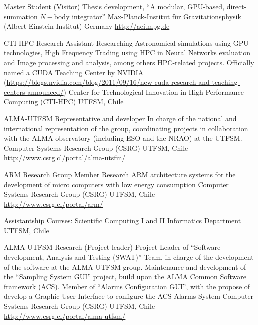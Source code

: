 \documentclass[12pt,a4paper]{moderncv}
\newcommand{\gray}{\textcolor{gray}}
\newcommand{\myurl}[1]{\gray{\url{#1}}}
\newcommand{\aei}{Max-Planck-Institut für Gravitationsphysik (Albert-Einstein-Institut)}
\begin{document}
        {Master Student (Visitor)}
        {Thesis development, %
        ``A modular, GPU-based, direct-summation $N-$body integrator'' }
        {\aei}
        {Germany}
        {\myurl{http://aei.mpg.de}}

        {CTI-HPC Research Assistant}
        {Researching %
         Astronomical simulations using GPU technologies, %
         High Frequency Trading using HPC in Neural Networks evaluation %
         and Image processing and analysis, among others HPC-related projects.
         Officially named a CUDA Teaching Center by NVIDIA
         (\myurl{https://blogs.nvidia.com/blog/2011/09/16/new-cuda-research-and-teaching-centers-announced/})
         }
        {Center for Technological Innovation in High Performance Computing (CTI-HPC)}
        {UTFSM, Chile}
        {}

        {ALMA-UTFSM Representative and developer}
        {In charge of the national and international representation of the group,
         coordinating projects in collaboration with the ALMA observatory
         (including ESO and the NRAO) at the UTFSM.}
        {Computer Systems Research Group (CSRG)}
        {UTFSM, Chile}
        {\myurl{http://www.csrg.cl/portal/alma-utsfm/}}

        {ARM Research Group Member}
        {Research ARM architecture systems for the development of micro computers
         with low energy consumption}
        {Computer Systems Research Group (CSRG)}
        {UTFSM, Chile}
        {\myurl{http://www.csrg.cl/portal/arm/}}

        {Assistantship}
        {Courses: Scientific Computing I and II}
        {Informatics Department}
        {UTFSM, Chile}
        {}

        {ALMA-UTFSM Research (Project leader)}
        {Project Leader of ``Software development, Analysis and Testing (SWAT)''
         Team, in charge of the development of the software at the ALMA-UTFSM group.
         Maintenance and development of the ``Sampling System GUI'' project,
         build upon the ALMA Common Software framework (ACS).
         Member of ``Alarms Configuration GUI'', with the propose of develop a
         Graphic User Interface to configure the ACS Alarms System}
        {Computer Systems Research Group (CSRG)}
        {UTFSM, Chile}
        {\myurl{http://www.csrg.cl/portal/alma-utfsm/}}
\end{document}
